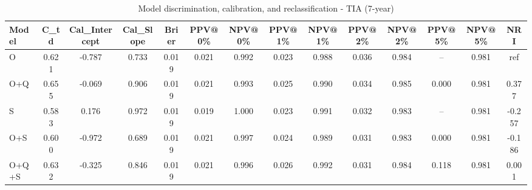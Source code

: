 \begin{table}[htbp]
\centering
\small
\caption{Model discrimination, calibration, and reclassification - TIA (7-year)}
\label{tab:perf_tia_7y}
\begin{tabular}{lccccccccccccc}
\toprule
Model & C\_td & Cal\_Intercept & Cal\_Slope & Brier & PPV@0\% & NPV@0\% & PPV@1\% & NPV@1\% & PPV@2\% & NPV@2\% & PPV@5\% & NPV@5\% & NRI \\
\midrule
O & 0.621 & -0.787 & 0.733 & 0.019 & 0.021 & 0.992 & 0.023 & 0.988 & 0.036 & 0.984 & -- & 0.981 & ref \\
O+Q & 0.655 & -0.069 & 0.906 & 0.019 & 0.021 & 0.993 & 0.025 & 0.990 & 0.034 & 0.985 & 0.000 & 0.981 & 0.377 \\
S & 0.583 & 0.176 & 0.972 & 0.019 & 0.019 & 1.000 & 0.023 & 0.991 & 0.032 & 0.983 & -- & 0.981 & -0.257 \\
O+S & 0.600 & -0.972 & 0.689 & 0.019 & 0.021 & 0.997 & 0.024 & 0.989 & 0.031 & 0.983 & 0.000 & 0.981 & -0.186 \\
O+Q+S & 0.632 & -0.325 & 0.846 & 0.019 & 0.021 & 0.996 & 0.026 & 0.992 & 0.031 & 0.984 & 0.118 & 0.981 & 0.001 \\
\bottomrule
\end{tabular}
\end{table}